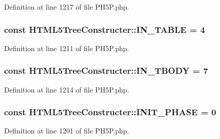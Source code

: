 Definition at line 1217 of file P\+H5\+P.\+php.

\hypertarget{classHTML5TreeConstructer_ab0c451330ab3a1a0387ef62bb4b48f1c}{
\subsubsection[{I\+N\+\_\+\+T\+A\+B\+L\+E}]{\setlength{\rightskip}{0pt plus 5cm}const H\+T\+M\+L5\+Tree\+Constructer\+::\+I\+N\+\_\+\+T\+A\+B\+L\+E = 4}}\label{classHTML5TreeConstructer_ab0c451330ab3a1a0387ef62bb4b48f1c}


Definition at line 1211 of file P\+H5\+P.\+php.

\hypertarget{classHTML5TreeConstructer_acd979180a3036c84c5b04f9547189f9a}{
\subsubsection[{I\+N\+\_\+\+T\+B\+O\+D\+Y}]{\setlength{\rightskip}{0pt plus 5cm}const H\+T\+M\+L5\+Tree\+Constructer\+::\+I\+N\+\_\+\+T\+B\+O\+D\+Y = 7}}\label{classHTML5TreeConstructer_acd979180a3036c84c5b04f9547189f9a}


Definition at line 1214 of file P\+H5\+P.\+php.

\hypertarget{classHTML5TreeConstructer_a025c5721f05fef6911dead9c3ce5dd17}{
\subsubsection[{I\+N\+I\+T\+\_\+\+P\+H\+A\+S\+E}]{\setlength{\rightskip}{0pt plus 5cm}const H\+T\+M\+L5\+Tree\+Constructer\+::\+I\+N\+I\+T\+\_\+\+P\+H\+A\+S\+E = 0}}\label{classHTML5TreeConstructer_a025c5721f05fef6911dead9c3ce5dd17}


Definition at line 1201 of file P\+H5\+P.\+php.

